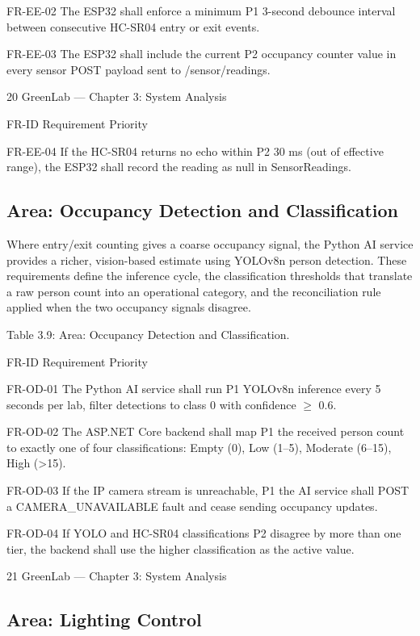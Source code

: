 FR-EE-02 The ESP32 shall enforce a minimum P1
3-second debounce interval between
consecutive HC-SR04 entry or exit
events.

FR-EE-03 The ESP32 shall include the current P2
occupancy counter value in every
sensor POST payload sent to
/sensor/readings.




20
GreenLab --- Chapter 3: System Analysis


FR-ID Requirement Priority

FR-EE-04 If the HC-SR04 returns no echo within P2
30 ms (out of effective range), the
ESP32 shall record the reading as null
in SensorReadings.


\subsection{Area: Occupancy Detection and Classification}

Where entry/exit counting gives a coarse occupancy signal, the Python AI service provides a
richer, vision-based estimate using YOLOv8n person detection. These requirements define the
inference cycle, the classification thresholds that translate a raw person count into an operational
category, and the reconciliation rule applied when the two occupancy signals disagree.

Table 3.9: Area: Occupancy Detection and Classification.

FR-ID Requirement Priority

FR-OD-01 The Python AI service shall run P1
YOLOv8n inference every 5 seconds
per lab, filter detections to class 0 with
confidence $\ge$ 0.6.

FR-OD-02 The ASP.NET Core backend shall map P1
the received person count to exactly
one of four classifications: Empty (0),
Low (1--5), Moderate (6--15), High
(>15).

FR-OD-03 If the IP camera stream is unreachable, P1
the AI service shall POST a
CAMERA_UNAVAILABLE fault and
cease sending occupancy updates.

FR-OD-04 If YOLO and HC-SR04 classifications P2
disagree by more than one tier, the
backend shall use the higher
classification as the active value.




21
GreenLab --- Chapter 3: System Analysis


\subsection{Area: Lighting Control}

